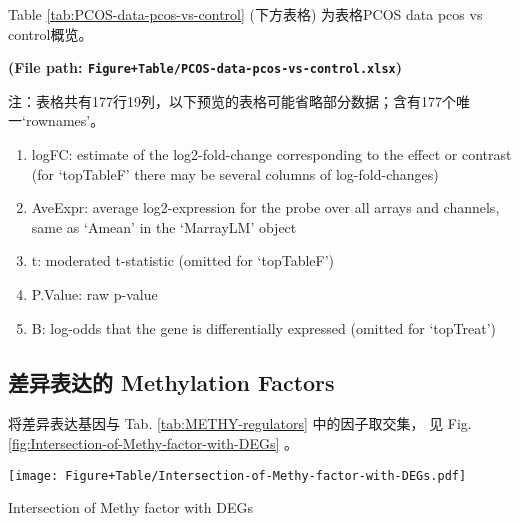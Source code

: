 \documentclass[
]{article}
\providecommand{\tightlist}{%
  \setlength{\itemsep}{0pt}\setlength{\parskip}{0pt}}
\begin{document}
Table \ref{tab:PCOS-data-pcos-vs-control} (下方表格) 为表格PCOS data pcos vs control概览。

\textbf{(File path: \texttt{Figure+Table/PCOS-data-pcos-vs-control.xlsx})}

\begin{center}\begin{tcolorbox}[colback=gray!10, colframe=gray!50, width=0.9\linewidth, arc=1mm, boxrule=0.5pt]注：表格共有177行19列，以下预览的表格可能省略部分数据；含有177个唯一`rownames'。
\end{tcolorbox}
\end{center}
\begin{center}\begin{tcolorbox}[colback=gray!10, colframe=gray!50, width=0.9\linewidth, arc=1mm, boxrule=0.5pt]\begin{enumerate}\tightlist
\item logFC:  estimate of the log2-fold-change corresponding to the effect or contrast (for ‘topTableF’ there may be several columns of log-fold-changes)
\item AveExpr:  average log2-expression for the probe over all arrays and channels, same as ‘Amean’ in the ‘MarrayLM’ object
\item t:  moderated t-statistic (omitted for ‘topTableF’)
\item P.Value:  raw p-value
\item B:  log-odds that the gene is differentially expressed (omitted for ‘topTreat’)
\end{enumerate}\end{tcolorbox}
\end{center}

\begin{center}\vspace{1.5cm}\end{center}

\hypertarget{ux5deeux5f02ux8868ux8fbeux7684-methylation-factors}{%
\subsection{差异表达的 Methylation Factors}\label{ux5deeux5f02ux8868ux8fbeux7684-methylation-factors}}

将差异表达基因与 Tab. \ref{tab:METHY-regulators} 中的因子取交集，
见 Fig. \ref{fig:Intersection-of-Methy-factor-with-DEGs} 。

\begin{center}\vspace{1.5cm}\end{center}
\def\@captype{figure}
\begin{center}
\texttt{[image: Figure+Table/Intersection-of-Methy-factor-with-DEGs.pdf]}
\caption{Intersection of Methy factor with DEGs}\label{fig:Intersection-of-Methy-factor-with-DEGs}
\end{center}
\end{document}
